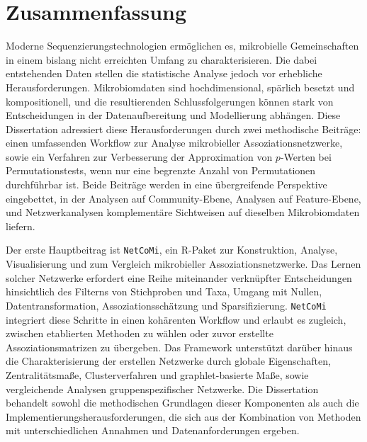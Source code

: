 
\chapter*{Zusammenfassung}

Moderne Sequenzierungstechnologien ermöglichen es, mikrobielle Gemeinschaften in einem bislang nicht erreichten Umfang zu charakterisieren. Die dabei entstehenden Daten stellen die statistische Analyse jedoch vor erhebliche Herausforderungen. Mikrobiomdaten sind hochdimensional, spärlich besetzt und kompositionell, und die resultierenden Schlussfolgerungen können stark von Entscheidungen in der Datenaufbereitung und Modellierung abhängen. Diese Dissertation adressiert diese Herausforderungen durch zwei methodische Beiträge: einen umfassenden Workflow zur Analyse mikrobieller Assoziationsnetzwerke, sowie ein Verfahren zur Verbesserung der Approximation von $p$-Werten bei Permutationstests, wenn nur eine begrenzte Anzahl von Permutationen durchführbar ist. Beide Beiträge werden in eine übergreifende Perspektive eingebettet, in der Analysen auf Community-Ebene, Analysen auf Feature-Ebene, und Netzwerkanalysen komplementäre Sichtweisen auf dieselben Mikrobiomdaten liefern.

Der erste Hauptbeitrag ist \texttt{NetCoMi}, ein R-Paket zur Konstruktion, Analyse, Visualisierung und zum Vergleich mikrobieller Assoziationsnetzwerke. Das Lernen solcher Netzwerke erfordert eine Reihe miteinander verknüpfter Entscheidungen hinsichtlich des Filterns von Stichproben und Taxa, Umgang mit Nullen, Datentransformation, Assoziationsschätzung und Sparsifizierung. \texttt{NetCoMi} integriert diese Schritte in einen kohärenten Workflow und erlaubt es zugleich, zwischen etablierten Methoden zu wählen oder zuvor erstellte Assoziationsmatrizen zu übergeben. Das Framework unterstützt darüber hinaus die Charakterisierung der erstellen Netzwerke durch globale Eigenschaften, Zentralitätsmaße, Clusterverfahren und graphlet-basierte Maße, sowie vergleichende Analysen gruppenspezifischer Netzwerke. Die Dissertation behandelt sowohl die methodischen Grundlagen dieser Komponenten als auch die Implementierungsherausforderungen, die sich aus der Kombination von Methoden mit unterschiedlichen Annahmen und Datenanforderungen ergeben.

